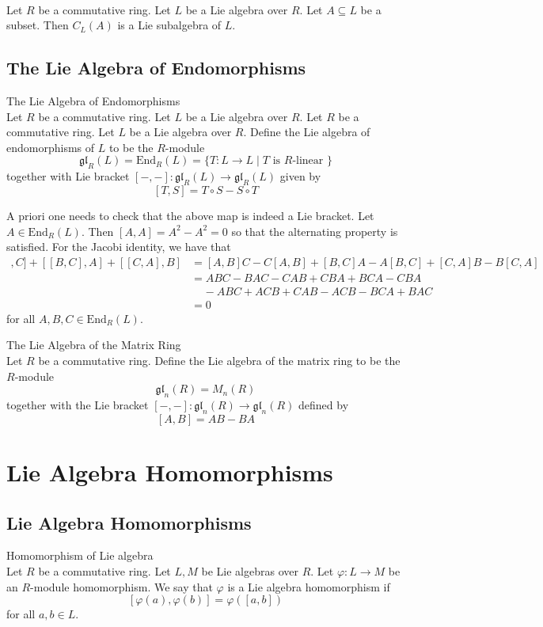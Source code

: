 \documentclass[a4paper]{article}
\begin{document}
\begin{lmm}{}{}\\
Let $R$ be a commutative ring. Let $L$ be a Lie algebra over $R$. Let $A\subseteq L$ be a subset. Then $C_L(A)$ is a Lie subalgebra of $L$. 
\end{lmm}

\subsection{The Lie Algebra of Endomorphisms}
\begin{defn}{The Lie Algebra of Endomorphisms}{}\\
Let $R$ be a commutative ring. Let $L$ be a Lie algebra over $R$. Let $R$ be a commutative ring. Let $L$ be a Lie algebra over $R$. Define the Lie algebra of endomorphisms of $L$ to be the $R$-module $$\mathfrak{gl}_R(L)=\text{End}_R(L)=\{T:L\to L\;|\;T\text{ is }R\text{-linear }\}$$  together with Lie bracket $[-,-]:\mathfrak{gl}_R(L)\to\mathfrak{gl}_R(L)$ given by $$[T,S]=T\circ S-S\circ T$$
\end{defn}

A priori one needs to check that the above map is indeed a Lie bracket. Let $A\in\text{End}_R(L)$. Then $[A,A]=A^2-A^2=0$ so that the alternating property is satisfied. For the Jacobi identity, we have that 
\begin{align*}
[[A,B],C]+[[B,C],A]+[[C,A],B]&=[A,B]C-C[A,B]+[B,C]A-A[B,C]+[C,A]B-B[C,A]\\
&=ABC-BAC-CAB+CBA+BCA-CBA\\
&\;\;\;\;-ABC+ACB+CAB-ACB-BCA+BAC\\
&=0
\end{align*}
for all $A,B,C\in\text{End}_R(L)$. 

\begin{defn}{The Lie Algebra of the Matrix Ring}{}\\
Let $R$ be a commutative ring. Define the Lie algebra of the matrix ring to be the $R$-module $$\mathfrak{gl}_n(R)=M_n(R)$$ together with the Lie bracket $[-,-]:\mathfrak{gl}_n(R)\to\mathfrak{gl}_n(R)$ defined by $$[A,B]=AB-BA$$
\end{defn}

\pagebreak
\section{Lie Algebra Homomorphisms}
\subsection{Lie Algebra Homomorphisms}
\begin{defn}{Homomorphism of Lie algebra}{}\\
Let $R$ be a commutative ring. Let $L,M$ be Lie algebras over $R$. Let $\varphi:L\to M$ be an $R$-module homomorphism. We say that $\varphi$ is a Lie algebra homomorphism if $$[\varphi(a),\varphi(b)]=\varphi\left([a,b]\right)$$ for all $a,b\in L$. 
\end{defn}
\end{document}
